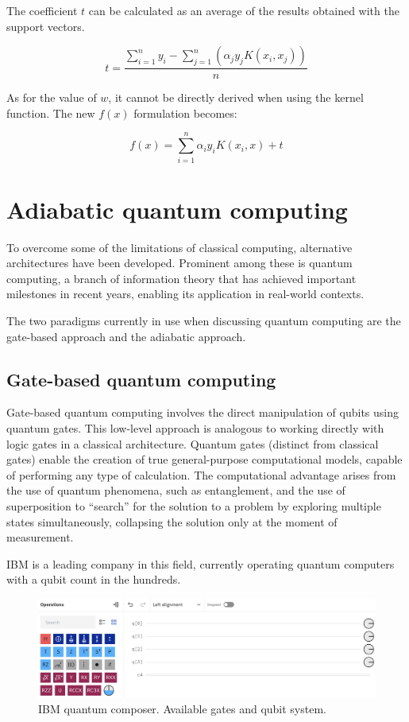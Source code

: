 The coefficient $t$ can be calculated as an average of the results obtained with the support vectors.

$$t = \frac{\sum_{i=1}^n y_i - \sum_{j=1}^n(\alpha_jy_jK(x_i,x_j))}{n}$$

As for the value of $w$, it cannot be directly derived when using the kernel function. The new $f(x)$ formulation becomes:

$$f(x)=\sum_{i=1}^n\alpha_iy_iK(x_i, x) + t$$

\section{Adiabatic quantum computing}

To overcome some of the limitations of classical computing, alternative architectures have been developed. Prominent among these is quantum computing, a branch of information theory that has achieved important milestones in recent years, enabling its application in real-world contexts.

The two paradigms currently in use when discussing quantum computing are the gate-based approach and the adiabatic approach.

\subsection{Gate-based quantum computing}

Gate-based quantum computing involves the direct manipulation of qubits using quantum gates\cite{QGate}. This low-level approach is analogous to working directly with logic gates in a classical architecture. Quantum gates (distinct from classical gates) enable the creation of true general-purpose computational models, capable of performing any type of calculation. The computational advantage arises from the use of quantum phenomena, such as entanglement, and the use of superposition to ``search'' for the solution to a problem by exploring multiple states simultaneously, collapsing the solution only at the moment of measurement.

IBM is a leading company in this field, currently operating quantum computers with a qubit count in the hundreds.

\begin{figure}[H]
  \centering
  \includegraphics[width=\textwidth]{figures/4qubit}
  \caption{IBM quantum composer. Available gates and qubit system.}
\end{figure}

